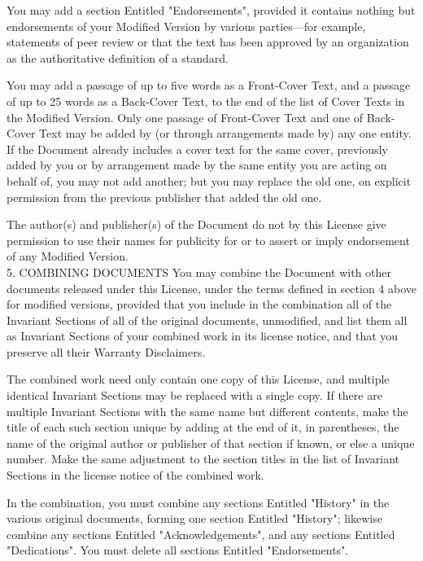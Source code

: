 \documentclass[10pt,a4paper]{article}
\begin{document}
\begin{scriptsize}
You may add a section Entitled "Endorsements", provided it contains nothing but endorsements of your Modified Version by various parties—for example, statements of peer review or that the text has been approved by an organization as the authoritative definition of a standard.

You may add a passage of up to five words as a Front-Cover Text, and a passage of up to 25 words as a Back-Cover Text, to the end of the list of Cover Texts in the Modified Version. Only one passage of Front-Cover Text and one of Back-Cover Text may be added by (or through arrangements made by) any one entity. If the Document already includes a cover text for the same cover, previously added by you or by arrangement made by the same entity you are acting on behalf of, you may not add another; but you may replace the old one, on explicit permission from the previous publisher that added the old one.

The author(s) and publisher(s) of the Document do not by this License give permission to use their names for publicity for or to assert or imply endorsement of any Modified Version.\\

5. COMBINING DOCUMENTS
You may combine the Document with other documents released under this License, under the terms defined in section 4 above for modified versions, provided that you include in the combination all of the Invariant Sections of all of the original documents, unmodified, and list them all as Invariant Sections of your combined work in its license notice, and that you preserve all their Warranty Disclaimers.

The combined work need only contain one copy of this License, and multiple identical Invariant Sections may be replaced with a single copy. If there are multiple Invariant Sections with the same name but different contents, make the title of each such section unique by adding at the end of it, in parentheses, the name of the original author or publisher of that section if known, or else a unique number. Make the same adjustment to the section titles in the list of Invariant Sections in the license notice of the combined work.

In the combination, you must combine any sections Entitled "History" in the various original documents, forming one section Entitled "History"; likewise combine any sections Entitled "Acknowledgements", and any sections Entitled "Dedications". You must delete all sections Entitled "Endorsements".\\


\end{scriptsize}
\end{document}
